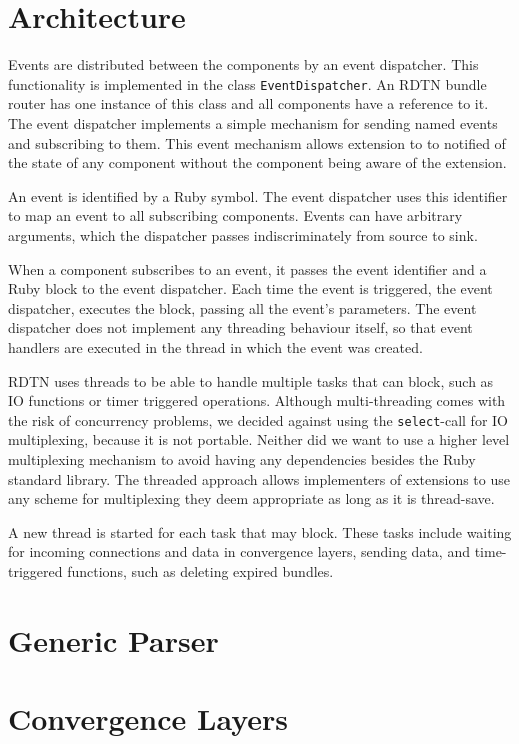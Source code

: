 \documentclass{article}
\begin{document}
\section{Architecture}\label{sec.arch}

Events are distributed between the components by an event dispatcher. This
functionality is implemented in the class {\tt EventDispatcher}. An RDTN bundle
router has one instance of this class and all components have a reference to it.
The event dispatcher implements a simple mechanism for sending named events and
subscribing to them.  This event mechanism allows extension to to notified of
the state of any component without the component being aware of the extension.

An event is identified by a Ruby symbol. The event dispatcher uses this
identifier to map an event to all subscribing components. Events can have
arbitrary arguments, which the dispatcher passes indiscriminately from source to
sink.

When a component subscribes to an event, it passes the event identifier and a
Ruby block to the event dispatcher. Each time the event is triggered, the event
dispatcher, executes the block, passing all the event's parameters.  The event
dispatcher does not implement any threading behaviour itself, so that event
handlers are executed in the thread in which the event was created.

RDTN uses threads to be able to handle multiple tasks that can block, such as IO
functions or timer triggered operations. Although multi-threading comes with the
risk of concurrency problems, we decided against using the {\tt select}-call for
IO multiplexing, because it is not portable. Neither did we want to use a higher
level multiplexing mechanism to avoid having any dependencies besides the Ruby
standard library. The threaded approach allows implementers of extensions to use
any scheme for multiplexing they deem appropriate as long as it is thread-save.

A new thread is started for each task that may block. These tasks include
waiting for incoming connections and data in convergence layers, sending data,
and time-triggered functions, such as deleting expired bundles.

\section{Generic Parser}\label{sec.genparser}

\section{Convergence Layers}\label{sec.cl}
\end{document}
